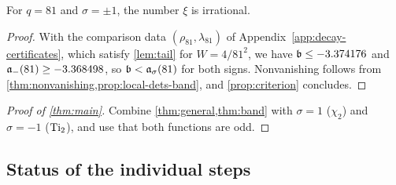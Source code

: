 \begin{theorem}\label{thm:band}
For $q=81$ and $\sigma=\pm1$, the number $\xi$ is irrational.
\end{theorem}

\begin{proof}
With the comparison data $(\rho_{81},\lambda_{81})$ of Appendix~\ref{app:decay-certificates}, which
satisfy \cref{lem:tail} for $W=4/81^2$, we have $\mathfrak{b}\le-3.374176$ and
$\mathfrak{a}_-(81)\ge-3.368498$, so $\mathfrak{b}<\mathfrak{a}_\sigma(81)$ for both signs. Nonvanishing follows
from \cref{thm:nonvanishing,prop:local-dets-band}, and \cref{prop:criterion} concludes.
\end{proof}

\begin{proof}[Proof of \cref{thm:main}]
Combine \cref{thm:general,thm:band} with $\sigma=1$ ($\chi_2$) and $\sigma=-1$ ($\operatorname{Ti}_2$), and use
that both functions are odd.
\end{proof}

\subsection{Status of the individual steps}\label{subsec:step-status}

